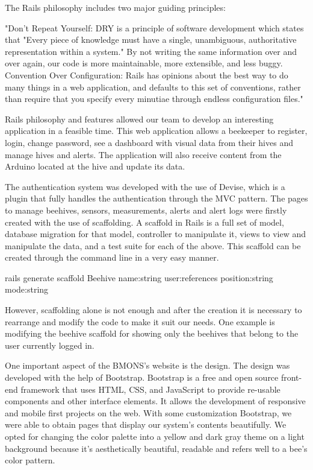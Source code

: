 The Rails philosophy includes two major guiding principles:

"Don't Repeat Yourself: DRY is a principle of software development which states that "Every piece of knowledge must have a single, unambiguous, authoritative representation within a system." By not writing the same information over and over again, our code is more maintainable, more extensible, and less buggy.
Convention Over Configuration: Rails has opinions about the best way to do many things in a web application, and defaults to this set of conventions, rather than require that you specify every minutiae through endless configuration files."

Rails philosophy and features allowed our team to develop an interesting application in a feasible time. This web application allows a beekeeper to register, login, change password, see a dashboard with visual data from their hives and manage hives and alerts. The application will also receive content from the Arduino located at the hive and update its data.

The authentication system was developed with the use of Devise, which is a plugin that fully handles the authentication through the MVC pattern. The pages to manage beehives, sensors, measurements, alerts and alert logs were firstly created with the use of scaffolding. A scaffold in Rails is a full set of model, database migration for that model, controller to manipulate it, views to view and manipulate the data, and a test suite for each of the above. This scaffold can be created through the command line in a very easy manner.

rails generate scaffold Beehive name:string user:references position:string mode:string

However, scaffolding alone is not enough and after the creation it is necessary to rearrange and modify the code to make it suit our needs. One example is modifying the beehive scaffold for showing only the beehives that belong to the user currently logged in.

One important aspect of the BMONS's website is the design. The design was developed with the help of Bootstrap. Bootstrap is a free and open source front-end framework that uses HTML, CSS, and JavaScript to provide re-usable components and other interface elements. It allows the development of responsive and mobile first projects on the web. With some customization Bootstrap, we were able to obtain pages that display our system's contents beautifully. We opted for changing the color palette into a yellow
and dark gray theme on a light background because it's aesthetically beautiful, readable and refers well to a bee's color pattern.

